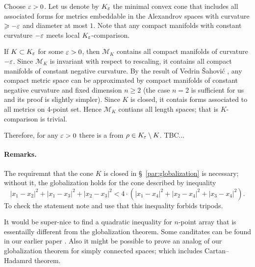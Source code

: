 \documentclass[a4paper,10pt]{article}
\begin{document}
Choose $\varepsilon>0$.
Let us denote by $K_\varepsilon$ the minimal convex cone that includes all associated forms for metrics embeddable in the Alexandrov spaces with curvature $\geqslant-\varepsilon$ and diameter at most $1$.
Note that any compact manifolds with constant curvature $-\varepsilon$ meets local $K_\varepsilon$-comparison.

If $K\subset K_\varepsilon$ for some $\varepsilon>0$, then $\mathcal{M}_K$ contains all compact manifolds of curvature $-\varepsilon$.
Since $\mathcal{M}_K$ is invariant with respect to rescaling, it contains all compact manifolds of constant negative curvature.
By the result of Vedrin Šahović \cite{sahovic2009}, any compact metric space can be approximated by compact manifolds of constant negative curvature and fixed dimension $n\ge 2$ (the case $n=2$ is sufficient for us and its proof is slightly simpler).
Since $K$ is closed, it contais forms associated to all metrics on 4-point set.
Hence $\mathcal{M}_K$ contians all length spaces; that is $K$-comparison is trivial.

Therefore, for any $\varepsilon>0$ there is a from $\rho\in K_\varepsilon\setminus K$.
TBC...
\qeds

\paragraph{Remarks.}
The requiremnt that the cone $K$ is closed in §~\ref{par:globalization} is necessary;
without it, the globalization holds for the cone described by inequality
\[|x_1-x_2|^2+|x_1-x_3|^2+|x_2-x_3|^2<4\cdot(|x_1-x_4|^2+|x_2-x_4|^2+|x_3-x_4|^2).\]
To check the statement note and use that this inequality forbids tripods.

It would be super-nice to find a quadratic inequality for $n$-point array that is essentailly different from the globalization theorem.
Some canditates can be found in our earlier paper \cite{lebedeva-petrunin-zolotov}.
Also it might be possible to prove an analog of our globalization theorem for simply connected spaces; which includes Cartan--Hadamrd theorem.

{\sloppy
\def\emph{\textit}
\printbibliography[heading=bibintoc]
\fussy
}
\end{document}
